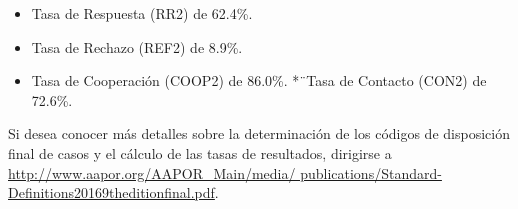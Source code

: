 \documentclass[
]{book}
\providecommand{\tightlist}{%
  \setlength{\itemsep}{0pt}\setlength{\parskip}{0pt}}
\begin{document}
\begin{itemize}
\tightlist
\item
  Tasa de Respuesta (RR2) de 62.4\%.
\item
  Tasa de Rechazo (REF2) de 8.9\%.
\item
  Tasa de Cooperación (COOP2) de 86.0\%.
  *¨Tasa de Contacto (CON2) de 72.6\%.
\end{itemize}

Si desea conocer más detalles sobre la determinación de los códigos de disposición final de casos
y el cálculo de las tasas de resultados, dirigirse a \href{http://www.aapor.org/AAPOR_Main/media/\%20publications/Standard-Definitions20169theditionfinal.pdf}{http://www.aapor.org/AAPOR\_Main/media/
publications/Standard-Definitions20169theditionfinal.pdf}.

\begin{table}


\end{table}
\end{document}
